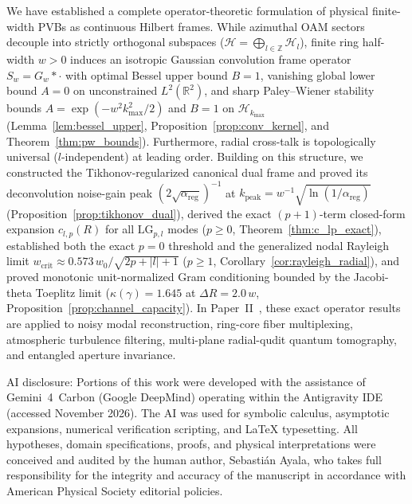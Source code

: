 \documentclass[aps,pra,reprint,nofootinbib,floatfix,longbibliography]{revtex4-2}
\theoremstyle{remark}
\newcommand{\abs}[1]{\lvert #1 \rvert}
\begin{document}
We have established a complete operator-theoretic formulation of physical finite-width PVBs as continuous Hilbert frames. While azimuthal OAM sectors decouple into strictly orthogonal subspaces ($\mathcal{H} = \bigoplus_{l\in\mathbb{Z}}\mathcal{H}_l$), finite ring half-width $w > 0$ induces an isotropic Gaussian convolution frame operator $S_w = G_w * \cdot$ with optimal Bessel upper bound $B = 1$, vanishing global lower bound $A = 0$ on unconstrained $L^2(\mathbb{R}^2)$, and sharp Paley--Wiener stability bounds $A = \exp(-w^2 k_{\max}^2/2)$ and $B = 1$ on $\mathcal{H}_{k_{\max}}$ (Lemma~\ref{lem:bessel_upper}, Proposition~\ref{prop:conv_kernel}, and Theorem~\ref{thm:pw_bounds}). Furthermore, radial cross-talk is topologically universal ($l$-independent) at leading order. Building on this structure, we constructed the Tikhonov-regularized canonical dual frame and proved its deconvolution noise-gain peak $(2\sqrt{\alpha_{\mathrm{reg}}})^{-1}$ at $k_{\mathrm{peak}} = w^{-1}\sqrt{\ln(1/\alpha_{\mathrm{reg}})}$ (Proposition~\ref{prop:tikhonov_dual}), derived the exact $(p+1)$-term closed-form expansion $c_{l,p}(R)$ for all $\mathrm{LG}_{p,l}$ modes ($p \ge 0$, Theorem~\ref{thm:c_lp_exact}), established both the exact $p = 0$ threshold and the generalized nodal Rayleigh limit $w_{\mathrm{crit}} \approx 0.573\,w_0/\sqrt{2p+\abs{l}+1}$ ($p \ge 1$, Corollary~\ref{cor:rayleigh_radial}), and proved monotonic unit-normalized Gram conditioning bounded by the Jacobi-theta Toeplitz limit ($\kappa(\gamma) = 1.645$ at $\Delta R = 2.0\,w$, Proposition~\ref{prop:channel_capacity}). In Paper~II~\cite{AyalaPaperII}, these exact operator results are applied to noisy modal reconstruction, ring-core fiber multiplexing, atmospheric turbulence filtering, multi-plane radial-qudit quantum tomography, and entangled aperture invariance.

\begin{acknowledgments}
AI disclosure: Portions of this work were developed with the assistance of Gemini~4~Carbon (Google DeepMind) operating within the Antigravity IDE (accessed November 2026). The AI was used for symbolic calculus, asymptotic expansions, numerical verification scripting, and \LaTeX{} typesetting. All hypotheses, domain specifications, proofs, and physical interpretations were conceived and audited by the human author, Sebasti\'an Ayala, who takes full responsibility for the integrity and accuracy of the manuscript in accordance with American Physical Society editorial policies.
\end{acknowledgments}
\end{document}
